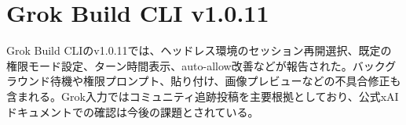 \section{Grok Build CLI v1.0.11}
Grok Build CLIのv1.0.11では、ヘッドレス環境のセッション再開選択、既定の権限モード設定、ターン時間表示、auto-allow改善などが報告された。バックグラウンド待機や権限プロンプト、貼り付け、画像プレビューなどの不具合修正も含まれる。Grok入力ではコミュニティ追跡投稿を主要根拠としており、公式xAIドキュメントでの確認は今後の課題とされている。
